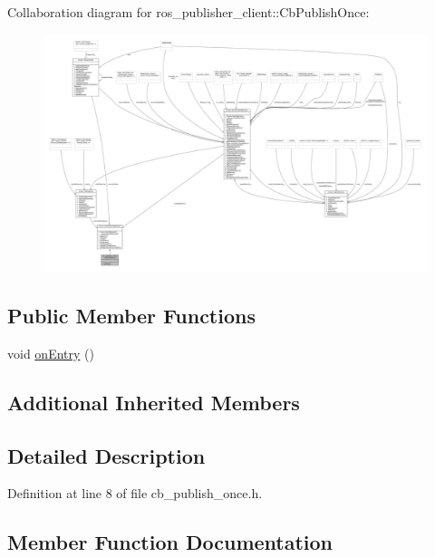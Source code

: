 Collaboration diagram for ros\+\_\+publisher\+\_\+client\+:\+:Cb\+Publish\+Once\+:
\nopagebreak
\begin{figure}[H]
\begin{center}
\leavevmode
\includegraphics[width=350pt]{classros__publisher__client_1_1CbPublishOnce__coll__graph}
\end{center}
\end{figure}
\subsection*{Public Member Functions}
\begin{DoxyCompactItemize}
\item 
void \hyperlink{classros__publisher__client_1_1CbPublishOnce_a943fbaacb1a4a88fa4403d1b7c6c49c2}{on\+Entry} ()
\end{DoxyCompactItemize}
\subsection*{Additional Inherited Members}


\subsection{Detailed Description}


Definition at line 8 of file cb\+\_\+publish\+\_\+once.\+h.



\subsection{Member Function Documentation}
